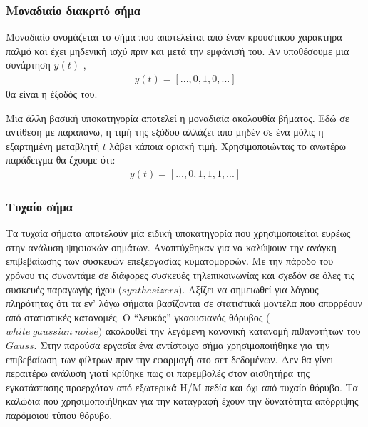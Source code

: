 \documentclass[breaklines=true, 12pt]{article}
\begin{document}
\subsubsection{Μοναδιαίο διακριτό σήμα}
\label{sec:org59bb5e4}
Μοναδιαίο ονομάζεται το σήμα που αποτελείται από έναν κρουστικού
χαρακτήρα παλμό και έχει μηδενική ισχύ πριν και μετά την εμφάνισή
του. Αν υποθέσουμε μια συνάρτηση \(y(t)\) ,
\begin{equation}
\begin{align}
y(t) = [..., 0, 1, 0, ...]
\end{align}
\end{equation}
θα είναι η έξοδός του.

Μια άλλη βασική υποκατηγορία αποτελεί η μοναδιαία ακολουθία βήματος.
Εδώ σε αντίθεση με παραπάνω, η τιμή της εξόδου αλλάζει από μηδέν σε ένα
μόλις η εξαρτημένη μεταβλητή \(t\) λάβει κάποια οριακή τιμή.
Χρησιμοποιώντας το ανωτέρω παράδειγμα θα έχουμε ότι:
\begin{equation}
\begin{align}
y(t) = [..., 0, 1, 1, 1, ...]
\end{align}
\end{equation}
\subsubsection{Τυχαίο σήμα}
\label{sec:org9f54d9c}
Τα τυχαία σήματα αποτελούν μία ειδική υποκατηγορία που χρησιμοποιείται
ευρέως στην ανάλυση ψηφιακών σημάτων. Αναπτύχθηκαν για να καλύψουν την
ανάγκη επιβεβαίωσης των συσκευών επεξεργασίας κυματομορφών. Με την
πάροδο του χρόνου τις συναντάμε σε διάφορες συσκευές τηλεπικοινωνίας
και σχεδόν σε όλες τις συσκευές παραγωγής ήχου (\(synthesizers\)).
Αξίζει να σημειωθεί για λόγους πληρότητας ότι τα εν' λόγω σήματα
βασίζονται σε στατιστικά μοντέλα που απορρέουν από στατιστικές κατανομές.
Ο “λευκός” γκαουσιανός θόρυβος (\(white\ gaussian\ noise)\) ακολουθεί
την λεγόμενη κανονική κατανομή πιθανοτήτων του \(Gauss\). Στην παρούσα
εργασία ένα αντίστοιχο σήμα χρησιμοποιήθηκε για την επιβεβαίωση των
φίλτρων πριν την εφαρμογή στο σετ δεδομένων. Δεν θα γίνει περαιτέρω
ανάλυση γιατί κρίθηκε πως οι παρεμβολές στον αισθητήρα της εγκατάστασης
προερχόταν από εξωτερικά Η/Μ πεδία και όχι από τυχαίο θόρυβο. Τα καλώδια
που χρησιμοποιήθηκαν για την καταγραφή έχουν την δυνατότητα απόρριψης
παρόμοιου τύπου θόρυβο.
\end{document}
